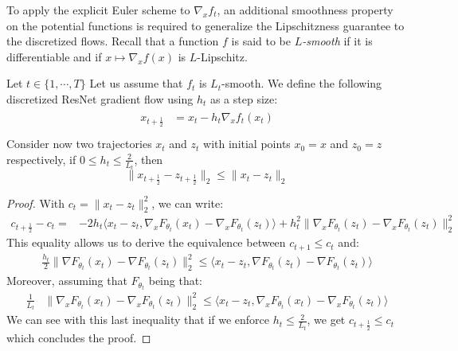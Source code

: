 To apply the explicit Euler scheme to $\nabla_x f_t$, an  additional smoothness property on the potential functions is required  to generalize the Lipschitzness guarantee to the discretized flows. Recall that a function $f$ is said to be \emph{$L$-smooth} if it is differentiable and if $x\mapsto\nabla_x f(x)$ is $L$-Lipschitz. 
\begin{prop}\label{prop:discrete_convex_potentials}
Let $t\in\{1,\cdots,T\}$ Let us assume that $f_{t}$ is $L_t$-smooth. We  define the following discretized ResNet gradient flow using $h_t$ as a step size:
\begin{align*}
    \begin{array}{ll}
    x_{t+\frac12} &= x_{t}-h_{t}\nabla_xf_{t}(x_{t})\\
  \end{array}
 \end{align*}
Consider now two trajectories $x_t$ and $z_t$ with initial points $x_0=x$ and $z_0=z$ respectively,  if $0\leq h_t\leq \frac{2}{L_t}$,  then 
$$\lVert x_{t+\frac12}-z_{t+\frac12}\rVert_2\leq \lVert x_t-z_t\rVert_2$$
\end{prop}
\begin{proof}
  With $c_t = \lVert x_t -z_t\rVert_2^2$, we can write:
  \begin{align*}
     c_{t+\frac12} - c_t = &-2 h_t \big\langle x_t - z_t, \nabla_xF_{\theta_{t}}(x_t) - \nabla_xF_{\theta_{t}}(z_t)  \big\rangle+ h_t^2 \lVert \nabla_xF_{\theta_{t}}(z_t) - \nabla_xF_{\theta_{t}}(z_t)\rVert_2^2
  \end{align*}
  This equality allows us to derive the equivalence between  $c_{t+1} \leq c_t$ and: 
  \begin{align*}
     \frac{h_t}{2}
     \lVert  \nabla F_{\theta_{t}}(x_t) - \nabla F_{\theta_{t}}(z_t)\rVert_2^2
     \leq
     \langle x_t -z_t, \nabla F_{\theta_{t}}(z_t) - \nabla F_{\theta_{t}}(z_t) \rangle 
  \end{align*}
  Moreover, assuming that $F_{\theta_t}$ being  that:
  \begin{align*}
     \frac{1}{L_t} &\lVert \nabla_xF_{\theta_{t}}(x_t) - \nabla_xF_{\theta_{t}}(z_t)\rVert_2^2 
     \leq\big\langle x_t -z_t, \nabla_xF_{\theta_{t}}(x_t) - \nabla_xF_{\theta_{t}}(z_t) \big\rangle
  \end{align*}
  We can see with this last inequality that if we enforce  $h_t \leq \frac{2}{L_t}$, we get $c_{t+\frac12} \leq c_t$ which concludes the proof.
  \end{proof}
  


